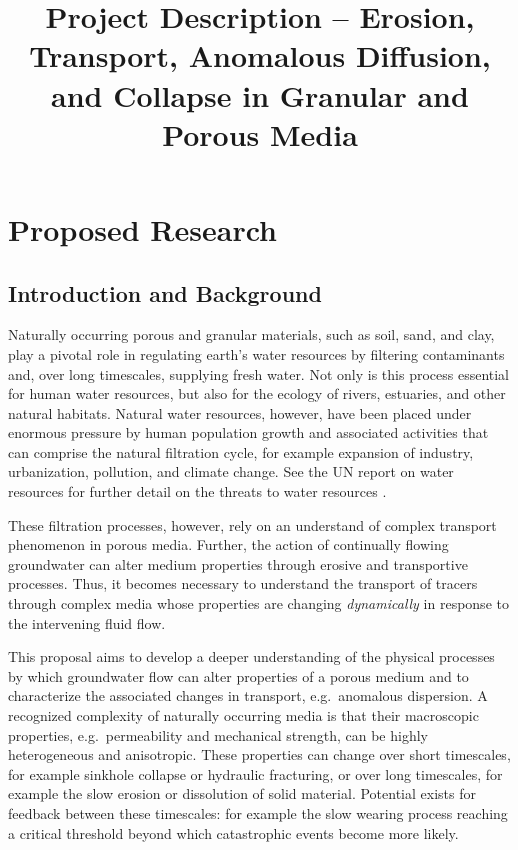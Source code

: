 \documentclass[12pt]{article}
\begin{document}
\title{Project Description --
Erosion, Transport, Anomalous Diffusion, and Collapse in Granular and Porous Media}

\date{}
\maketitle

\section{Proposed Research} 

\subsection{Introduction and Background} 

	Naturally occurring porous and granular materials, such as soil, sand, and clay, play a pivotal role in regulating earth's water resources by filtering contaminants and, over long timescales, supplying fresh water. Not only is this process essential for human water resources, but also for the ecology of rivers, estuaries, and other natural habitats. Natural water resources, however, have been placed under enormous pressure by human population growth and associated activities that can comprise the natural filtration cycle, for example expansion of industry, urbanization, pollution, and climate change. See the UN report on water resources for further detail on the threats to water resources \cite{UNwater}.

	These filtration processes, however, rely on an understand of complex transport phenomenon in porous media. Further, the action of continually flowing groundwater can alter medium properties through erosive and transportive processes. Thus, it becomes necessary to understand the transport of tracers through complex media whose properties are changing {\em dynamically} in response to the intervening fluid flow.
	
	This proposal aims to develop a deeper understanding of the physical processes by which groundwater flow can alter properties of a porous medium and to characterize the associated changes in transport, e.g.~anomalous dispersion. A recognized complexity of naturally occurring media is that their macroscopic properties, e.g.~permeability and mechanical strength, can be highly heterogeneous and anisotropic. These properties can change over short timescales, for example sinkhole collapse or hydraulic fracturing, or over long timescales, for example the slow erosion or dissolution of solid material. Potential exists for feedback between these timescales: for example the slow wearing process reaching a critical threshold beyond which catastrophic events become more likely.
	
\end{document}
